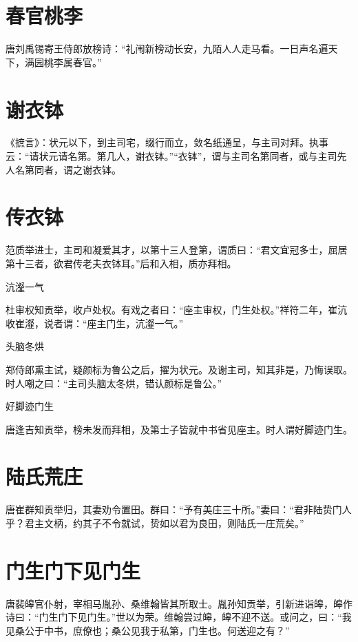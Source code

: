 \documentclass[a4paper,12pt,UTF8,twoside]{ctexbook}
\begin{document}
    \section{春官桃李}
    
    唐刘禹锡寄王侍郎放榜诗：“礼闱新榜动长安，九陌人人走马看。一日声名遍天下，满园桃李属春官。”
    
    \section{谢衣钵}
    
    《摭言》：状元以下，到主司宅，缀行而立，敛名纸通呈，与主司对拜。执事云：“请状元请名第。第几人，谢衣钵。”“衣钵”，谓与主司名第同者，或与主司先人名第同者，谓之谢衣钵。
    
    \section{传衣钵}
    
    范质举进士，主司和凝爱其才，以第十三人登第，谓质曰：“君文宜冠多士，屈居第十三者，欲君传老夫衣钵耳。”后和入相，质亦拜相。
    
    沆瀣一气
    
    杜审权知贡举，收卢处权。有戏之者曰：“座主审权，门生处权。”祥符二年，崔沆收崔瀣，说者谓：“座主门生，沆瀣一气。”
    
    头脑冬烘
    
    郑侍郎熏主试，疑颜标为鲁公之后，擢为状元。及谢主司，知其非是，乃悔误取。时人嘲之曰：“主司头脑太冬烘，错认颜标是鲁公。”
    
    好脚迹门生
    
    唐逢吉知贡举，榜未发而拜相，及第士子皆就中书省见座主。时人谓好脚迹门生。
    
    \section{陆氏荒庄}
    
    唐崔群知贡举归，其妻劝令置田。群曰：“予有美庄三十所。”妻曰：“君非陆贽门人乎？君主文柄，约其子不令就试，贽如以君为良田，则陆氏一庄荒矣。”
    
    \section{门生门下见门生}
    
    唐裴皞官仆射，宰相马胤孙、桑维翰皆其所取士。胤孙知贡举，引新进诣皞，皞作诗曰：“门生门下见门生。”世以为荣。维翰尝过皞，皞不迎不送。或问之，曰：“我见桑公于中书，庶僚也；桑公见我于私第，门生也。何送迎之有？”
    
\end{document}
